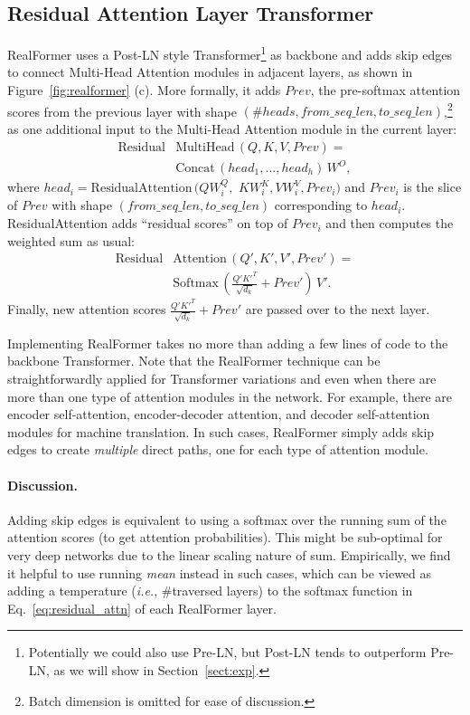 \documentclass[11pt,a4paper]{article}
\begin{document}
\subsection{Residual Attention Layer Transformer} \label{sec:realformer}
RealFormer uses a Post-LN style Transformer\footnote{Potentially we could also use Pre-LN, but Post-LN tends to outperform Pre-LN, as we will show in Section~\ref{sect:exp}.}  as backbone and adds skip edges to connect Multi-Head Attention modules in adjacent layers, as shown in Figure~\ref{fig:realformer} (c). More formally, it adds $Prev$, the pre-softmax attention scores from the previous layer with shape $(\#heads, from\_seq\_len, to\_seq\_len)$,\footnote{Batch dimension is omitted for ease of discussion.} as one additional input to the Multi-Head Attention module in the current layer:
\begin{align*}
\text{Residual} & \text{MultiHead} \, (Q, K, V, Prev) = \\ 
                & \text{Concat} \, (head_1, ..., head_h)\, W^O,
\end{align*}
where $head_i = \text{ResidualAttention} \, (QW^Q_i, $ $ KW^K_i, VW^V_i, Prev_i)$ and $Prev_i$ is the slice of $Prev$ with shape $( from\_seq\_len, to\_seq\_len)$ corresponding to $head_i$.
ResidualAttention adds ``residual scores'' on top of $Prev_i$ and then computes the weighted sum as usual:
\begin{equation} \label{eq:residual_attn}
\begin{split}
\text{Residual} & \text{Attention}  \, (Q', K', V', Prev') = \\  
                 & \text{Softmax} \, (\frac{Q'K'^T}{\sqrt{d_k}} + Prev') \, V'.
\end{split}
\end{equation}
Finally, new attention scores $\frac{Q'K'^T}{\sqrt{d_k}} + Prev'$ are passed over to the next layer.

Implementing RealFormer takes no more than adding a few lines of code to the backbone Transformer. Note that the RealFormer technique can be straightforwardly applied for Transformer variations and even when there are more than one type of attention modules in the network. For example, there are encoder self-attention, encoder-decoder attention, and decoder self-attention modules for machine translation. In such cases, RealFormer simply adds skip edges to create \emph{multiple} direct paths, one for each type of attention module.

\paragraph{Discussion.} Adding skip edges is equivalent to using a softmax over the running sum of the attention scores (to get attention probabilities). This might be sub-optimal for very deep networks due to the linear scaling nature of sum. Empirically, we find it helpful to use running \emph{mean} instead in such cases, which can be viewed as adding a temperature (\emph{i.e.}, \#traversed layers) to the softmax function in Eq.~\ref{eq:residual_attn} of each RealFormer layer.
\end{document}
